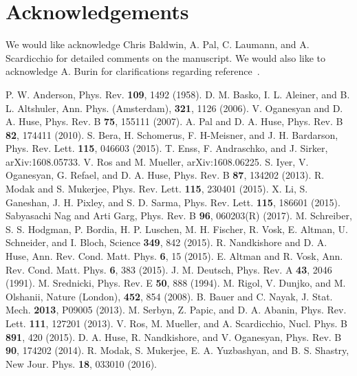 \documentclass[prl,aps,twocolumn,floats,nofootinbib]{revtex4}
\begin{document}
\section{Acknowledgements}
We would like acknowledge Chris Baldwin, A. Pal, C. Laumann, and A. Scardicchio for detailed comments on the manuscript. We would also like to acknowledge A. Burin for clarifications regarding reference~\cite{Burin}. 
\begin{thebibliography}{99}
\vspace{1cm}
P. W. Anderson, Phys. Rev. {\bf 109}, 1492 (1958).
D. M. Basko, I. L. Aleiner, and B. L. Altshuler, Ann. Phys. (Amsterdam), {\bf 321}, 1126 (2006). 
V. Oganesyan  and  D. A. Huse, Phys. Rev. B {\bf 75}, 155111 (2007). 
A. Pal and D. A. Huse, Phys. Rev. B {\bf 82}, 174411 (2010).  
S. Bera, H. Schomerus, F. H-Meisner, and J. H. Bardarson, Phys. Rev. Lett. {\bf 115}, 046603 (2015). 
T. Enss, F. Andraschko, and J. Sirker, arXiv:1608.05733.
V. Ros and M. Mueller, arXiv:1608.06225. 
S. Iyer, V. Oganesyan, G. Refael, and D. A. Huse, Phys. Rev. B {\bf 87}, 134202 (2013).
R. Modak and S. Mukerjee, Phys. Rev. Lett. {\bf 115}, 230401 (2015).
X. Li, S. Ganeshan, J. H. Pixley, and S. D. Sarma, Phys. Rev. Lett. {\bf 115}, 186601 (2015). 
Sabyasachi Nag and Arti Garg, Phys. Rev. B {\bf 96}, 060203(R) (2017).
M. Schreiber, S. S. Hodgman, P. Bordia, H. P. Luschen, M. H. Fischer, R. Vosk, E. Altman, U. Schneider, and I. Bloch, Science {\bf 349}, 842 (2015).
R. Nandkishore and D. A. Huse, Ann. Rev. Cond. Matt. Phys. {\bf 6}, 15 (2015). 
E. Altman and R. Vosk, Ann. Rev. Cond. Matt. Phys. {\bf 6}, 383 (2015).
J. M. Deutsch, Phys. Rev. A {\bf 43}, 2046 (1991).
M. Srednicki, Phys. Rev. E {\bf 50}, 888 (1994).
M. Rigol, V. Dunjko, and M. Olshanii, Nature (London), {\bf 452}, 854 (2008).
B. Bauer and C. Nayak, J. Stat. Mech. {\bf 2013}, P09005 (2013).
M. Serbyn, Z. Papic, and D. A. Abanin, Phys. Rev. Lett. {\bf 111}, 127201 (2013).
V. Ros, M. Mueller, and A. Scardicchio, Nucl. Phys. B {\bf 891}, 420 (2015).
D. A. Huse, R. Nandkishore, and V. Oganesyan, Phys. Rev. B {\bf 90}, 174202 (2014).
R. Modak, S. Mukerjee, E. A. Yuzbashyan, and B. S. Shastry, New Jour. Phys. {\bf 18}, 033010 (2016).

\end{thebibliography}
\end{document}
